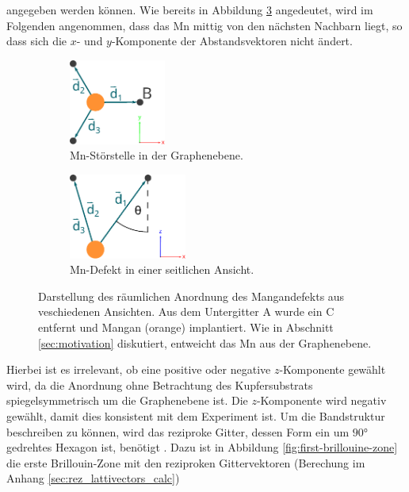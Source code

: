 angegeben werden können.
Wie bereits in Abbildung \ref{fig:mangan_impurity} angedeutet, wird im Folgenden angenommen, dass das Mn mittig von den nächsten Nachbarn liegt, so dass 
sich die $x$- und $y$-Komponente der Abstandsvektoren nicht ändert.
\begin{figure}
    \begin{subfigure}{0.48\textwidth}%
    \centering%
    \includegraphics[height = 2.8cm]{Plots/mangan_impurity_inplane.pdf}%
    \caption{Mn-Störstelle in der Graphenebene.}%
    \label{fig:mangan_impurity_inplane}%
    \end{subfigure}%
    \hfill%
    \begin{subfigure}{0.48\textwidth}%
    \centering%
    \includegraphics[height = 2.8cm]{Plots/mangan_impurity_z_component.pdf}%
    \caption{Mn-Defekt in einer seitlichen Ansicht.}%
    \label{fig:mangan_impurity_z_component}%
    \end{subfigure}%
    \caption{Darstellung des räumlichen Anordnung des Mangandefekts aus veschiedenen Ansichten.
    Aus dem Untergitter A wurde ein C entfernt und Mangan (orange) implantiert.
    Wie in Abschnitt \ref{sec:motivation} diskutiert, entweicht das Mn aus der Graphenebene.}%
    \label{fig:mangan_impurity}%
\end{figure}%
Hierbei ist es irrelevant, ob eine positive oder negative $z$-Komponente gewählt wird, da die Anordnung ohne Betrachtung des Kupfersubstrats 
spiegelsymmetrisch um die Graphenebene ist. 
Die $z$-Komponente wird negativ gewählt, damit dies konsistent mit dem Experiment ist.
Um die Bandstruktur beschreiben zu können, wird das reziproke Gitter, 
dessen Form ein um $\ang{90;;}$ gedrehtes Hexagon ist, benötigt \cite{honey}.
Dazu ist in Abbildung \ref{fig:first-brillouine-zone} die erste Brillouin-Zone mit den 
reziproken Gittervektoren (Berechung im Anhang \ref{sec:rez_lattivectors_calc})
